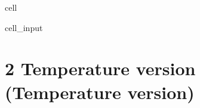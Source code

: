 \documentclass[letterpaper,10pt,english]{jupyterBook}
\begin{document}
\begin{sphinxuseclass}{cell}
\begin{sphinxVerbatimInput}
\begin{sphinxuseclass}{cell_input}
\begin{sphinxVerbatim}[commandchars=\\\{\}]
     
          
    
     

  
\end{sphinxVerbatim}

\end{sphinxuseclass}\end{sphinxVerbatimInput}

\end{sphinxuseclass}

\section{2 Temperature version (Temperature version)}
\label{\detokenize{2_Temperature/_2T_Problem_class_definition:temperature-version-temperature-version}}
\end{document}
